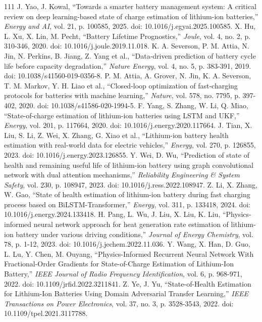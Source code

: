 \documentclass[journal]{IEEEtran}
\begin{document}
\begin{thebibliography}{111}
J. Yao, J. Kowal, ``Towards a smarter battery management system: A critical review on deep learning-based state of charge estimation of lithium-ion batteries,'' \emph{Energy and AI}, vol. 21, p. 100585, 2025. doi: 10.1016/j.egyai.2025.100585.
X. Hu, L. Xu, X. Lin, M. Pecht, ``Battery Lifetime Prognostics,'' \emph{Joule}, vol. 4, no. 2, p. 310-346, 2020. doi: 10.1016/j.joule.2019.11.018.
K. A. Severson, P. M. Attia, N. Jin, N. Perkins, B. Jiang, Z. Yang et al., ``Data-driven prediction of battery cycle life before capacity degradation,'' \emph{Nature Energy}, vol. 4, no. 5, p. 383-391, 2019. doi: 10.1038/s41560-019-0356-8.
P. M. Attia, A. Grover, N. Jin, K. A. Severson, T. M. Markov, Y. H. Liao et al., ``Closed-loop optimization of fast-charging protocols for batteries with machine learning,'' \emph{Nature}, vol. 578, no. 7795, p. 397-402, 2020. doi: 10.1038/s41586-020-1994-5.
F. Yang, S. Zhang, W. Li, Q. Miao, ``State-of-charge estimation of lithium-ion batteries using LSTM and UKF,'' \emph{Energy}, vol. 201, p. 117664, 2020. doi: 10.1016/j.energy.2020.117664.
J. Tian, X. Liu, S. Li, Z. Wei, X. Zhang, G. Xiao et al., ``Lithium-ion battery health estimation with real-world data for electric vehicles,'' \emph{Energy}, vol. 270, p. 126855, 2023. doi: 10.1016/j.energy.2023.126855.
Y. Wei, D. Wu, ``Prediction of state of health and remaining useful life of lithium-ion battery using graph convolutional network with dual attention mechanisms,'' \emph{Reliability Engineering \& System Safety}, vol. 230, p. 108947, 2023. doi: 10.1016/j.ress.2022.108947.
Z. Li, X. Zhang, W. Gao, ``State of health estimation of lithium-ion battery during fast charging process based on BiLSTM-Transformer,'' \emph{Energy}, vol. 311, p. 133418, 2024. doi: 10.1016/j.energy.2024.133418.
H. Pang, L. Wu, J. Liu, X. Liu, K. Liu, ``Physics-informed neural network approach for heat generation rate estimation of lithium-ion battery under various driving conditions,'' \emph{Journal of Energy Chemistry}, vol. 78, p. 1-12, 2023. doi: 10.1016/j.jechem.2022.11.036.
Y. Wang, X. Han, D. Guo, L. Lu, Y. Chen, M. Ouyang, ``Physics-Informed Recurrent Neural Network With Fractional-Order Gradients for State-of-Charge Estimation of Lithium-Ion Battery,'' \emph{IEEE Journal of Radio Frequency Identification}, vol. 6, p. 968-971, 2022. doi: 10.1109/jrfid.2022.3211841.
Z. Ye, J. Yu, ``State-of-Health Estimation for Lithium-Ion Batteries Using Domain Adversarial Transfer Learning,'' \emph{IEEE Transactions on Power Electronics}, vol. 37, no. 3, p. 3528-3543, 2022. doi: 10.1109/tpel.2021.3117788.

\end{thebibliography}
\end{document}
